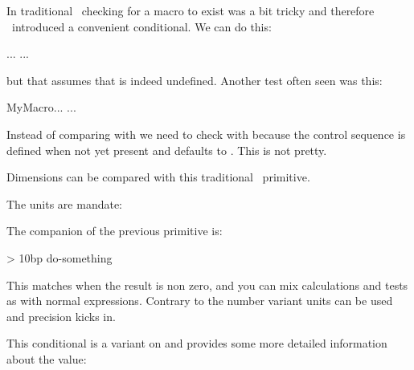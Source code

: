 In traditional \TEX\ checking for a macro to exist was a bit tricky and therefore
\ETEX\ introduced a convenient conditional. We can do this:

\starttyping
\ifx\MyMacro\undefined ... \else ... \fi
\stoptyping

but that assumes that \type {\undefined} is indeed undefined. Another test often
seen was this:

\starttyping
\expandafter\ifx\csname MyMacro\endcsname\relax ... \else ... \fi
\stoptyping

Instead of comparing with \type {\undefined} we need to check with 
because the control sequence is defined when not yet present and defaults to
. This is not pretty.

\stopoldprimitive

\startoldprimitive[title={\prm {ifdim}}]

Dimensions can be compared with this traditional \TEX\ primitive.

\startbuffer
\scratchdimen=1pt 

\ifdim\scratchdimen=\scratchcounter sp YES \else NOP\fi
\ifdim\scratchdimen=1               pt YES \else NOP\fi
\stopbuffer

\typebuffer

The units are mandate:

{\getbuffer}

\stopoldprimitive

\startnewprimitive[title={\prm {ifdimexpression}}]

The companion of the previous primitive is:

\startbuffer
\ifdimexpression 10pt > 10bp \relax
    do-something
\fi
\stopbuffer

This matches when the result is non zero, and you can mix calculations and tests
as with normal expressions. Contrary to the number variant units can be used and
precision kicks in.

\stopnewprimitive

\startnewprimitive[title={\prm {ifdimval}}]

This conditional is a variant on  and provides some more
detailed information about the value:

\stopbuffer

